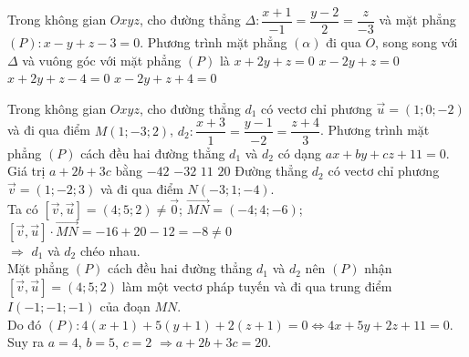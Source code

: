 \begin{ex}%
	Trong không gian $Oxyz$, cho đường thẳng $\Delta\colon \dfrac{x+1}{-1}=\dfrac{y-2}{2}=\dfrac{z}{-3}$ và mặt phẳng $(P)\colon x-y+z-3=0$. Phương trình mặt phẳng $(\alpha)$ đi qua $O$, song song với $\Delta$ và vuông góc với mặt phẳng $(P)$ là
	\choice 
		{\True $x+2 y+z=0$}
		{$x-2 y+z=0$}
		{$x+2 y+z-4=0$}
		{$x-2 y+z+4=0$}
\end{ex}
\begin{ex}%
	Trong không gian $Oxyz$, cho đường thẳng $d_1$ có vectơ chỉ phương $\overrightarrow{u}=(1;0;-2)$ và đi qua điểm $M(1;-3;2)$, $d_2\colon\dfrac{x+3}{1}=\dfrac{y-1}{-2}=\dfrac{z+4}{3}$. Phương trình mặt phẳng $(P)$ cách đều hai đường thẳng $d_1$ và $d_2$ có dạng $ax+by+cz+11=0$. Giá trị $ a+2b+3c$ bằng
	\choice
	{$-42$}
	{$-32$}
	{$ 11$}
	{\True $20$}
	\loigiai
	{
		Đường thẳng $d_2$ có vectơ chỉ phương $\overrightarrow{v}=(1;-2;3)$ và đi qua điểm $ N(-3;1;-4)$.\\
		Ta có $\left[\overrightarrow{v},\overrightarrow{u}\right]=(4;5;2)\ne\overrightarrow{0}$; $\overrightarrow{MN}=\left(-4;4;-6\right)$; $\left[\overrightarrow{v},\overrightarrow{u}\right]\cdot \overrightarrow{MN}=-16+20-12=-8\ne 0$\\
		$\Rightarrow $ $d_1$ và $d_2$ chéo nhau.\\
		Mặt phẳng $(P)$ cách đều hai đường thẳng $d_1$ và $d_2$ nên $(P)$ nhận $\left[\overrightarrow{v},\overrightarrow{u}\right]=(4;5;2)$ làm một vectơ pháp tuyến và đi qua trung điểm $ I(-1;-1;-1)$ của đoạn $ MN$.\\
		Do đó $(P)\colon 4\left(x+1\right)+5\left(y+1\right)+2\left(z+1\right)=0\Leftrightarrow 4x+5y+2z+11=0$.\\
		Suy ra $ a=4$, $b=5$, $c=2$ $\Rightarrow a+2b+3c=20$.}
\end{ex}

